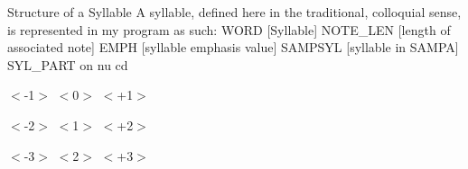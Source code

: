 \documentclass[10pt,oneside]{memoir}
\title{\mytitle}
\author{\myauthor}
\def\mychapterstyle{default}
\def\mypagestyle{headings}
\def\revision{}
\begin{document}
\chapterstyle{\mychapterstyle}
\pagestyle{\mypagestyle}

%
%

\frontmatter



\maketitle
\clearpage

\vspace*{\fill}

\setlength{\parindent}{0pt}

\ifx\mycopyright\undefined
\else
	\textcopyright{} \mycopyright
\fi

\revision

\begin{center}
\end{center}

\setlength{\parindent}{1em}
\clearpage

\tableofcontents


%
%


\setlength{\parindent}{1em}

\mainmatter
Structure of a Syllable
A syllable, defined here in the traditional, colloquial sense, is represented in my program as such: 
WORD
[Syllable]
NOTE\_LEN
[length of associated note]
EMPH
[syllable emphasis value]
SAMPSYL
[syllable in SAMPA]
SYL\_PART
on
nu
cd


$<$-1$>$
$<$0$>$
$<$+1$>$


$<$-2$>$
$<$1$>$
$<$+2$>$


$<$-3$>$
$<$2$>$
$<$+3$>$
\end{document}
